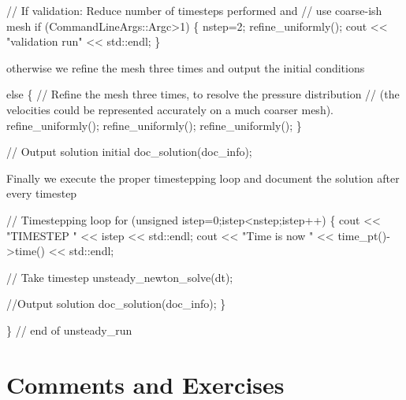 \begin{DoxyCodeInclude}

 \textcolor{comment}{// If validation: Reduce number of timesteps performed and }
 \textcolor{comment}{// use coarse-ish mesh}
 \textcolor{keywordflow}{if} (CommandLineArgs::Argc>1)
  \{
   nstep=2;
   refine\_uniformly();
   cout << \textcolor{stringliteral}{"validation run"} << std::endl;
  \}

\end{DoxyCodeInclude}


otherwise we refine the mesh three times and output the initial conditions


\begin{DoxyCodeInclude}
 \textcolor{keywordflow}{else}
  \{
   \textcolor{comment}{// Refine the mesh three times, to resolve the pressure distribution}
   \textcolor{comment}{// (the velocities could be represented accurately on a much coarser mesh).}
   refine\_uniformly();
   refine\_uniformly();
   refine\_uniformly();
  \}

 \textcolor{comment}{// Output solution initial }
 doc\_solution(doc\_info);

\end{DoxyCodeInclude}


Finally we execute the proper timestepping loop and document the solution after every timestep


\begin{DoxyCodeInclude}

 \textcolor{comment}{// Timestepping loop}
 \textcolor{keywordflow}{for} (\textcolor{keywordtype}{unsigned} istep=0;istep<nstep;istep++)
  \{
   cout << \textcolor{stringliteral}{"TIMESTEP "} << istep << std::endl;
   cout << \textcolor{stringliteral}{"Time is now "} << time\_pt()->time() << std::endl;

   \textcolor{comment}{// Take timestep }
   unsteady\_newton\_solve(dt);
     
   \textcolor{comment}{//Output solution}
   doc\_solution(doc\_info);
  \}

\} \textcolor{comment}{// end of unsteady\_run}

\end{DoxyCodeInclude}




 

\hypertarget{index_comments}{}\section{Comments and Exercises}\label{index_comments}

